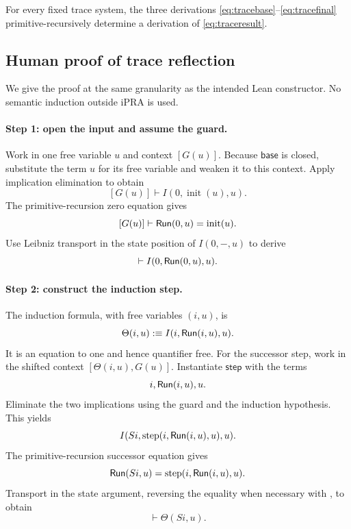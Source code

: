 \begin{theorem}
\label{thm:tracereflection}
For every fixed trace system, the three derivations
\eqref{eq:tracebase}--\eqref{eq:tracefinal} primitive-recursively determine a
derivation of \eqref{eq:traceresult}.
\end{theorem}

\subsection{Human proof of trace reflection}

We give the proof at the same granularity as the intended Lean constructor.
No semantic induction outside iPRA is used.

\paragraph{Step 1: open the input and assume the guard.}
Work in one free variable \(u\) and context \([G(u)]\).  Because
\(\mathsf{base}\) is closed, substitute the term \(u\) for its free variable
and weaken it to this context.  Apply implication elimination to obtain
\[
    [G(u)]\vdash I(0,\operatorname{init}(u),u).
\]
The primitive-recursion zero equation gives
\[
    [G(u)]\vdash
    \mathsf{Run}(0,u)=\operatorname{init}(u).
\]
Use Leibniz transport in the state position of \(I(0,-,u)\) to derive
\begin{equation}
   [G(u)]\vdash I(0,\Run(0,u),u).
   \label{eq:invbase}
\end{equation}

\paragraph{Step 2: construct the induction step.}
The induction formula, with free variables \((i,u)\), is
\[
      \Theta(i,u):\equiv I(i,\mathsf{Run}(i,u),u).
\]
It is an equation to one and hence quantifier free.  For the successor step,
work in the shifted context
\([\Theta(i,u),G(u)]\).  Instantiate \(\mathsf{step}\) with the terms
\[
     i,\\ \mathsf{Run}(i,u),\\ u.
\]
Eliminate the two implications using the guard and the induction hypothesis.
This yields
\[
 I(Si,\operatorname{step}(i,\mathsf{Run}(i,u),u),u).
\]
The primitive-recursion successor equation gives
\[
 \mathsf{Run}(Si,u)=\operatorname{step}(i,\mathsf{Run}(i,u),u).
\]
Transport in the state argument, reversing the equality when necessary with
, to obtain
\begin{equation}
 [\Theta(i,u),G(u)]\vdash\Theta(Si,u).
 \label{eq:invstep}
\end{equation}

